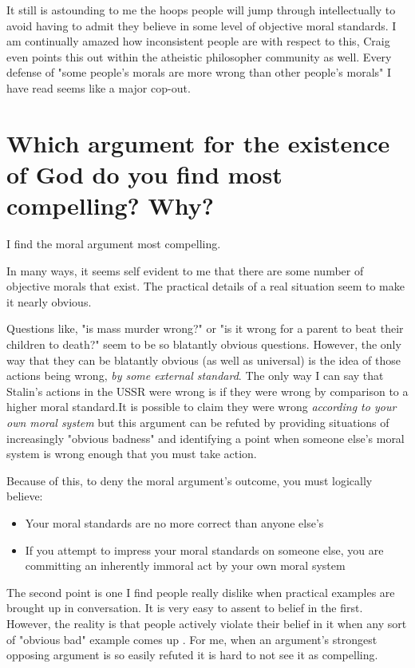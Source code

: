 \documentclass[12pt]{turabian-researchpaper}
\begin{document}
It still is astounding to me the hoops people will jump through intellectually to avoid having to admit they believe in some level of objective moral standards. I am continually amazed how inconsistent people are with respect to this, Craig even points this out within the atheistic philosopher community as well. Every defense of "some people's morals are more wrong than other people's morals" I have read seems like a major cop-out.

\section{Which argument for the existence of God do you find most compelling? Why?}

I find the moral argument most compelling.

In many ways, it seems self evident to me that there are some number of objective morals that exist. The practical details of a real situation seem to make it nearly obvious.

Questions like, "is mass murder wrong?" or "is it wrong for a parent to beat their children to death?" seem to be so blatantly obvious questions. However, the only way that they can be blatantly obvious (as well as universal) is the idea of those actions being wrong, \textit{by some external standard}. The only way I can say that Stalin's actions in the USSR were wrong is if they were wrong by comparison to a higher moral standard.It is possible to claim they were wrong \textit{according to your own moral system} but this argument can be refuted by providing situations of increasingly "obvious badness" and identifying a point when someone else's moral system is wrong enough that you must take action.

Because of this, to deny the moral argument's outcome, you must logically believe:

\begin{itemize}
\item Your moral standards are no more correct than anyone else's
\item If you attempt to impress your moral standards on someone else, you are committing an inherently immoral act by your own moral system
\end{itemize}

The second point is one I find people really dislike when practical examples are brought up in conversation. It is very easy to assent to belief in the first. However, the reality is that people actively violate their belief in it when any sort of "obvious bad" example comes up \autocite[pg.180-181]{craig2008reasonable}. For me, when an argument's strongest opposing argument is so easily refuted it is hard to not see it as compelling.
\end{document}
